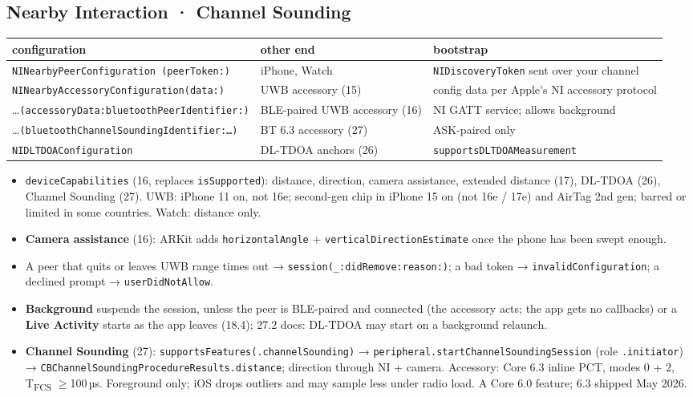 \documentclass[8pt]{extarticle}
\newcommand\ct[1]{\texttt{#1}}
\begin{document}
\begin{multicols}{2}
\section{Nearby Interaction · Channel Sounding}
{\scriptsize\setlength{\tabcolsep}{2pt}
\begin{tabular}{@{}>{\raggedright\arraybackslash}p{30mm}>{\raggedright\arraybackslash}p{19mm}>{\raggedright\arraybackslash}p{27mm}@{}}
\toprule
\textbf{configuration} & \textbf{other end} & \textbf{bootstrap}\\
\midrule
\ct{NINearbyPeerConfiguration (peerToken:)} & iPhone, Watch & \ct{NIDiscoveryToken} sent over your channel\\
\ct{NINearbyAccessory\-Configuration(data:)} & UWB accessory (15) & config data per Apple's NI accessory protocol\\
\ldots\ct{(accessoryData:bluetooth\-PeerIdentifier:)} & BLE-paired UWB accessory (16) & NI GATT service; allows background\\
\ldots\ct{(bluetoothChannel\-SoundingIdentifier:…)} & BT 6.3 accessory (27) & ASK-paired only\\
\ct{NIDLTDOAConfiguration} & DL-TDOA anchors (26) & \ct{supportsDLTDOA\-Measurement}\\
\bottomrule
\end{tabular}}
\begin{itemize}
  \item \ct{deviceCapabilities} (16, replaces \ct{isSupported}): distance, direction, camera
        assistance, extended distance (17), DL-TDOA (26), Channel Sounding (27). UWB: iPhone 11 on,
        not 16e; second-gen chip in iPhone 15 on (not 16e / 17e) and AirTag 2nd gen; barred or
        limited in some countries. Watch: distance only.
  \item \textbf{Camera assistance} (16): ARKit adds \ct{horizontalAngle} +
        \ct{verticalDirectionEstimate} once the phone has been swept enough.
  \item A peer that quits or leaves UWB range times out → \ct{session(\_:didRemove:reason:)}; a bad
        token → \ct{invalidConfiguration}; a declined prompt → \ct{userDidNotAllow}.
  \item \textbf{Background} suspends the session, unless the peer is BLE-paired and connected (the
        accessory acts; the app gets no callbacks) or a \textbf{Live Activity} starts as the app
        leaves (18.4); 27.2 docs: DL-TDOA may start on a background relaunch.
  \item \textbf{Channel Sounding} (27): \ct{supportsFeatures(.channelSounding)} →
        \ct{peripheral.startChannelSoundingSession} (role \ct{.initiator}) →
        \ct{CBChannelSoundingProcedureResults.distance}; direction through NI + camera. Accessory: Core
        6.3 inline PCT, modes 0 + 2, T\textsubscript{FCS} $\ge$100\,µs. Foreground only; iOS drops
        outliers and may sample less under radio load. A Core 6.0 feature; 6.3 shipped May 2026.
\end{itemize}


\end{multicols}
\end{document}
